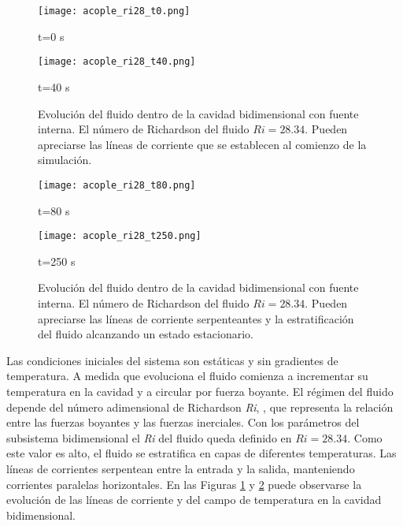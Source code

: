 \begin{figure}['ht]
	\begin{minipage}{0.5\linewidth}
		\centering
		\texttt{[image: acople\_ri28\_t0.png]}
		\caption{t=0 s}
		\label{asd}	
	\end{minipage}
	\begin{minipage}{0.5\linewidth}
		\centering
		\texttt{[image: acople\_ri28\_t40.png]}
		\caption{t=40 s}
		\label{asd}	
	\end{minipage}
	\caption{Evolución del fluido dentro de la cavidad bidimensional con fuente interna.
	El número de Richardson del fluido $Ri=28.34$.
	Pueden apreciarse las líneas de corriente que se establecen al comienzo de la simulación.} 
	\label{acople_ri28_1}
\end{figure}

\begin{figure}['ht]
	\begin{minipage}{0.5\linewidth}
		\centering
		\texttt{[image: acople\_ri28\_t80.png]}
		\caption{t=80 s}
		\label{asd}	
	\end{minipage}
	\begin{minipage}{0.5\linewidth}
		\centering
		\texttt{[image: acople\_ri28\_t250.png]}
		\caption{t=250 s}
		\label{asd}	
	\end{minipage}
	\caption{Evolución del fluido dentro de la cavidad bidimensional con fuente interna.
	El número de Richardson del fluido $Ri=28.34$.
	Pueden apreciarse las líneas de corriente serpenteantes y la estratificación del fluido alcanzando un estado estacionario.}  
	\label{acople_ri28_2}
\end{figure}

Las condiciones iniciales del sistema son estáticas y sin gradientes de temperatura.
A medida que evoluciona el fluido comienza a incrementar su temperatura en la cavidad y a circular por fuerza boyante.
El régimen del fluido depende del número adimensional de Richardson \textit{Ri}, \cite{richardson},
que representa la relación entre las fuerzas boyantes y las fuerzas inerciales.
Con los parámetros del subsistema bidimensional el \textit{Ri} del fluido queda definido en $Ri=28.34$.
Como este valor es alto, el fluido se estratifica en capas de diferentes temperaturas.
Las líneas de corrientes serpentean entre la entrada y la salida, manteniendo corrientes paralelas horizontales.
En las Figuras \ref{acople_ri28_1} y \ref{acople_ri28_2} puede observarse 
la evolución de las líneas de corriente y del campo de temperatura en la cavidad bidimensional.

